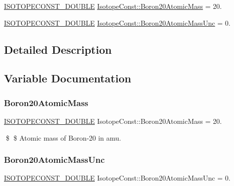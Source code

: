 \begin{DoxyCompactItemize}
\item 
\mbox{\hyperlink{group___isotope_const-_macros_ga8f45a7272ce02c0b4c65c44636ed719a}{I\+S\+O\+T\+O\+P\+E\+C\+O\+N\+S\+T\+\_\+\+D\+O\+U\+B\+LE}} \mbox{\hyperlink{group___isotope_const-_boron-_b20_ga86af028dc80eb27b20a95dad88d7cd73}{Isotope\+Const\+::\+Boron20\+Atomic\+Mass}} = 20.
\item 
\mbox{\hyperlink{group___isotope_const-_macros_ga8f45a7272ce02c0b4c65c44636ed719a}{I\+S\+O\+T\+O\+P\+E\+C\+O\+N\+S\+T\+\_\+\+D\+O\+U\+B\+LE}} \mbox{\hyperlink{group___isotope_const-_boron-_b20_ga8ea3ef44107d05e68a3c1da6d145b976}{Isotope\+Const\+::\+Boron20\+Atomic\+Mass\+Unc}} = 0.
\end{DoxyCompactItemize}


\subsection{Detailed Description}


\subsection{Variable Documentation}
\mbox{\label{group___isotope_const-_boron-_b20_ga86af028dc80eb27b20a95dad88d7cd73}} 
\subsubsection{\texorpdfstring{Boron20\+Atomic\+Mass}{Boron20AtomicMass}}
{\footnotesize\ttfamily \mbox{\hyperlink{group___isotope_const-_macros_ga8f45a7272ce02c0b4c65c44636ed719a}{I\+S\+O\+T\+O\+P\+E\+C\+O\+N\+S\+T\+\_\+\+D\+O\+U\+B\+LE}} Isotope\+Const\+::\+Boron20\+Atomic\+Mass = 20.}

\$ \$ Atomic mass of Boron-\/20 in amu. \mbox{\label{group___isotope_const-_boron-_b20_ga8ea3ef44107d05e68a3c1da6d145b976}} 
\subsubsection{\texorpdfstring{Boron20\+Atomic\+Mass\+Unc}{Boron20AtomicMassUnc}}
{\footnotesize\ttfamily \mbox{\hyperlink{group___isotope_const-_macros_ga8f45a7272ce02c0b4c65c44636ed719a}{I\+S\+O\+T\+O\+P\+E\+C\+O\+N\+S\+T\+\_\+\+D\+O\+U\+B\+LE}} Isotope\+Const\+::\+Boron20\+Atomic\+Mass\+Unc = 0.}

